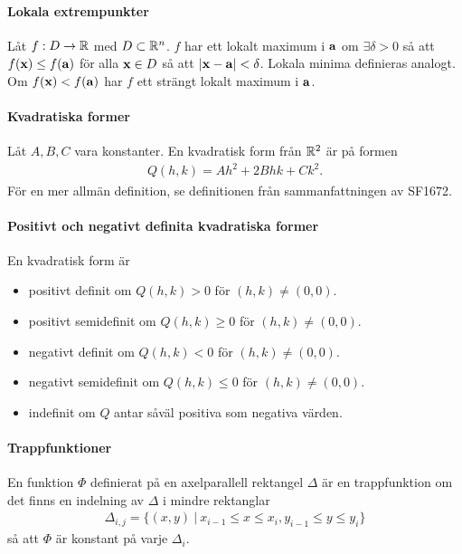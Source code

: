 \paragraph{Lokala extrempunkter}
Låt $f: D\to\mathbb{R}$ med $D\subset\mathbb{R}^n$. $f$ har ett lokalt maximum i $\vect{a}$ om $\exists\delta > 0$ så att $f(\vect{x})\leq f(\vect{a})$ för alla $\vect{x}\in D$ så att $\abs{\vect{x} - \vect{a}} < \delta$. Lokala minima definieras analogt. Om $f(\vect{x}) < f(\vect{a})$ har $f$ ett strängt lokalt maximum i $\vect{a}$.

\paragraph{Kvadratiska former}
Låt $A, B, C$ vara konstanter. En kvadratisk form från $\mathbb{R}^2$ är på formen
\begin{align*}
	Q(h, k) = Ah^2 + 2Bhk + Ck^2.
\end{align*}
För en mer allmän definition, se definitionen från sammanfattningen av SF1672.

\paragraph{Positivt och negativt definita kvadratiska former}
En kvadratisk form är
\begin{itemize}
	\item positivt definit om $Q(h, k) > 0$ för $(h, k)\neq (0,0)$.
	\item positivt semidefinit om $Q(h, k)\geq 0$ för $(h, k)\neq (0,0)$.
	\item negativt definit om $Q(h, k) < 0$ för $(h, k)\neq (0,0)$.
	\item negativt semidefinit om $Q(h, k)\leq 0$ för $(h, k)\neq (0,0)$.
	\item indefinit om $Q$ antar såväl positiva som negativa värden.
\end{itemize}

\paragraph{Trappfunktioner}
En funktion $\Phi$ definierat på en axelparallell rektangel $\Delta$ är en trappfunktion om det finns en indelning av $\Delta$ i mindre rektanglar
\begin{align*}
	\Delta_{i, j} = \{(x, y)\ |\ x_{i - 1}\leq x\leq x_i, y_{i - 1}\leq y\leq y_i\}
\end{align*}
så att $\Phi$ är konstant på varje $\Delta_i$.

